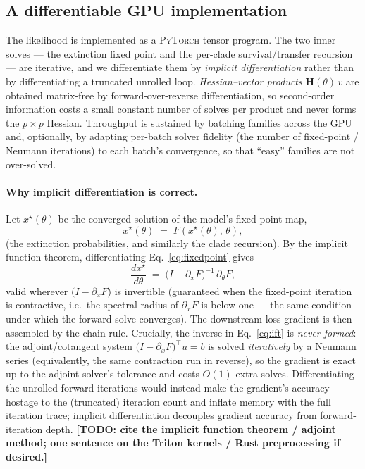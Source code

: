 \documentclass[11pt]{article}
\newcommand{\TODO}[1]{{\color{red!70!black}\textbf{[TODO: #1]}}}
\newcommand{\Hess}{\mathbf{H}}
\begin{document}
\subsection{A differentiable GPU implementation}
\label{sec:autodiff}
The likelihood is implemented as a \textsc{PyTorch} tensor program. The two
inner solves --- the extinction fixed point and the per-clade survival/transfer
recursion --- are iterative, and we differentiate them by \emph{implicit
differentiation} rather than by differentiating a truncated unrolled loop.
\emph{Hessian--vector products} $\Hess(\theta)\,v$ are obtained matrix-free by
forward-over-reverse differentiation, so second-order information costs a small
constant number of solves per product and never forms the $p\times p$ Hessian.
Throughput is sustained by batching families across the GPU and, optionally, by
adapting per-batch solver fidelity (the number of fixed-point / Neumann
iterations) to each batch's convergence, so that ``easy'' families are not
over-solved.

\paragraph{Why implicit differentiation is correct.} Let $x^\star(\theta)$ be
the converged solution of the model's fixed-point map,
\begin{equation}
  x^\star(\theta) \;=\; F\!\left(x^\star(\theta),\,\theta\right),
  \label{eq:fixedpoint}
\end{equation}
(the extinction probabilities, and similarly the clade recursion). By the
implicit function theorem, differentiating Eq.~\eqref{eq:fixedpoint} gives
\begin{equation}
  \frac{d x^\star}{d\theta}
   \;=\; \bigl(I-\partial_x F\bigr)^{-1}\,\partial_\theta F ,
  \label{eq:ift}
\end{equation}
valid wherever $\bigl(I-\partial_x F\bigr)$ is invertible (guaranteed when the
fixed-point iteration is contractive, i.e.\ the spectral radius of
$\partial_x F$ is below one --- the same condition under which the forward solve
converges). The downstream loss gradient is then assembled by the chain rule.
Crucially, the inverse in Eq.~\eqref{eq:ift} is \emph{never formed}: the
adjoint/cotangent system $\bigl(I-\partial_x F\bigr)^{\!\top} u = b$ is solved
\emph{iteratively} by a Neumann series (equivalently, the same contraction run
in reverse), so the gradient is exact up to the adjoint solver's tolerance and
costs $O(1)$ extra solves. Differentiating the unrolled forward iterations would
instead make the gradient's accuracy hostage to the (truncated) iteration count
and inflate memory with the full iteration trace; implicit differentiation
decouples gradient accuracy from forward-iteration depth.
\TODO{cite the implicit function theorem / adjoint method; one sentence on the
Triton kernels / Rust preprocessing if desired.}
\end{document}

